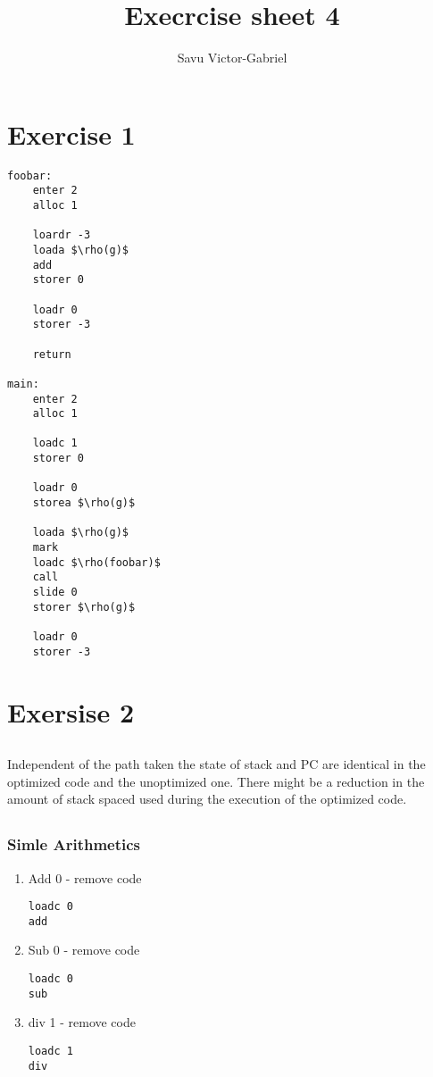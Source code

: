 \documentclass[10pt,a4paper]{article}
\title{Execrcise sheet 4}
\author{Savu Victor-Gabriel}
\begin{document}
	\maketitle
	
	\section{Exercise 1}
	
	\begin{lstlisting}[mathescape]
foobar:
	enter 2
	alloc 1
	
	loardr -3
	loada $\rho(g)$
	add
	storer 0
	
	loadr 0
	storer -3
	
	return

main:
	enter 2
	alloc 1
	
	loadc 1
	storer 0
	
	loadr 0
	storea $\rho(g)$
	
	loada $\rho(g)$
	mark
	loadc $\rho(foobar)$
	call
	slide 0
	storer $\rho(g)$
	
	loadr 0
	storer -3
	\end{lstlisting}
	
	\section{Exersise 2}
	
	\subsection{}
	Independent of the path taken the state of stack and PC are identical in the optimized code and the unoptimized one. There might be a reduction in the amount of stack spaced used during the execution of the optimized code.
	
	\subsection{}
	
	\subsubsection{Simle Arithmetics}
	\begin{enumerate}
		\item Add 0 - remove code
		\begin{lstlisting}
loadc 0
add
		\end{lstlisting}
		
		\item Sub 0 - remove code
		\begin{lstlisting}
loadc 0
sub
		\end{lstlisting}
		
		\item div 1 - remove code
		\begin{lstlisting}
loadc 1
div
		\end{lstlisting}
	\end{enumerate}
\end{document}

